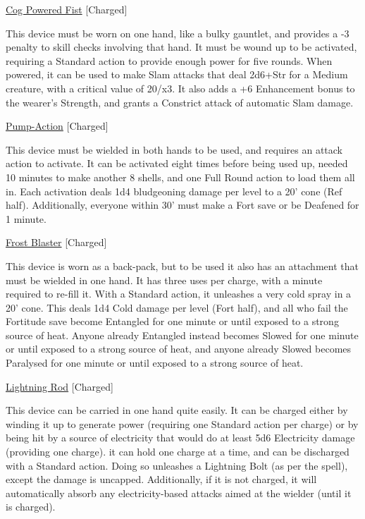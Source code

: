 \medskip\noindent\underline{Cog Powered Fist} [Charged]

\noindent This device must be worn on one hand, like a bulky gauntlet, and provides a -3 penalty to skill checks involving that hand. It must be wound up to be activated, requiring a Standard action to provide enough power for five rounds. When powered, it can be used to make Slam attacks that deal 2d6+Str for a Medium creature, with a critical value of 20/x3. It also adds a +6 Enhancement bonus to the wearer's Strength, and grants a Constrict attack of automatic Slam damage.

\medskip\noindent\underline{Pump-Action} [Charged]

\noindent This device must be wielded in both hands to be used, and requires an attack action to activate. It can be activated eight times before being used up, needed 10 minutes to make another 8 shells, and one Full Round action to load them all in. Each activation deals 1d4 bludgeoning damage per level to a 20' cone (Ref half). Additionally, everyone within 30' must make a Fort save or be Deafened for 1 minute.

\medskip\noindent\underline{Frost Blaster} [Charged]

\noindent This device is worn as a back-pack, but to be used it also has an attachment that must be wielded in one hand. It has three uses per charge, with a minute required to re-fill it. With a Standard action, it unleashes a very cold spray in a 20' cone. This deals 1d4 Cold damage per level (Fort half), and all who fail the Fortitude save become Entangled for one minute or until exposed to a strong source of heat. Anyone already Entangled instead becomes Slowed for one minute or until exposed to a strong source of heat, and anyone already Slowed becomes Paralysed for one minute or until exposed to a strong source of heat.

\medskip\noindent\underline{Lightning Rod} [Charged]

\noindent This device can be carried in one hand quite easily. It can be charged either by winding it up to generate power (requiring one Standard action per charge) or by being hit by a source of electricity that would do at least 5d6 Electricity damage (providing one charge). it can hold one charge at a time, and can be discharged with a Standard action. Doing so unleashes a Lightning Bolt (as per the spell), except the damage is uncapped. Additionally, if it is not charged, it will automatically absorb any electricity-based attacks aimed at the wielder (until it is charged).

